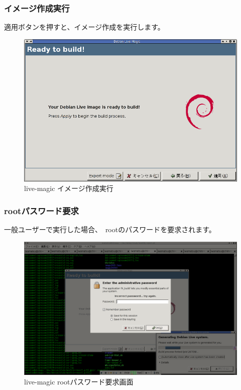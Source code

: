 \documentclass[mingoth,a4paper]{jsarticle}
\begin{document}
\subsubsection{イメージ作成実行}
\begin{multicols}{2}
 適用ボタンを押すと、イメージ作成を実行します。

 \begin{figure}[H]
 \begin{center}
  \includegraphics[width=1\hsize]{image200711/live-magic05.png}
 \end{center}
 \caption{live-magic イメージ作成実行}
 \label{live-magic05}
 \end{figure}
\end{multicols}


\subsubsection{rootパスワード要求}

\begin{multicols}{2}
 一般ユーザーで実行した場合、　rootのパスワードを要求されます。

 \begin{figure}[H]
 \begin{center}
  \includegraphics[width=1\hsize]{image200711/live-magic06.png}
 \end{center}
 \caption{live-magic rootパスワード要求画面}
 \label{live-magic06}
 \end{figure}
\end{multicols}
\end{document}
